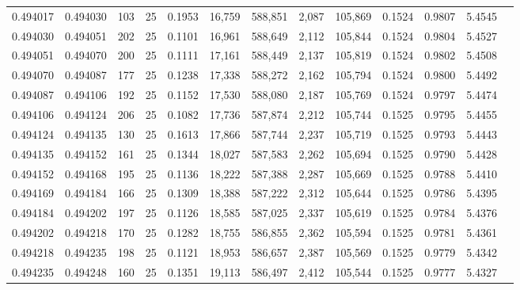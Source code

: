 \begin{tabular}{rrrrrrrrrrrrr}
0.494017 & 0.494030 & 103 &  25 &                                     0.1953 &  16,759 & 588,851 &   2,087 & 105,869 & 0.1524 & 0.9807 & 5.4545 \\
0.494030 & 0.494051 & 202 &  25 &                                     0.1101 &  16,961 & 588,649 &   2,112 & 105,844 & 0.1524 & 0.9804 & 5.4527 \\
0.494051 & 0.494070 & 200 &  25 &                                     0.1111 &  17,161 & 588,449 &   2,137 & 105,819 & 0.1524 & 0.9802 & 5.4508 \\
0.494070 & 0.494087 & 177 &  25 &                                     0.1238 &  17,338 & 588,272 &   2,162 & 105,794 & 0.1524 & 0.9800 & 5.4492 \\
0.494087 & 0.494106 & 192 &  25 &                                     0.1152 &  17,530 & 588,080 &   2,187 & 105,769 & 0.1524 & 0.9797 & 5.4474 \\
0.494106 & 0.494124 & 206 &  25 &                                     0.1082 &  17,736 & 587,874 &   2,212 & 105,744 & 0.1525 & 0.9795 & 5.4455 \\
0.494124 & 0.494135 & 130 &  25 &                                     0.1613 &  17,866 & 587,744 &   2,237 & 105,719 & 0.1525 & 0.9793 & 5.4443 \\
0.494135 & 0.494152 & 161 &  25 &                                     0.1344 &  18,027 & 587,583 &   2,262 & 105,694 & 0.1525 & 0.9790 & 5.4428 \\
0.494152 & 0.494168 & 195 &  25 &                                     0.1136 &  18,222 & 587,388 &   2,287 & 105,669 & 0.1525 & 0.9788 & 5.4410 \\
0.494169 & 0.494184 & 166 &  25 &                                     0.1309 &  18,388 & 587,222 &   2,312 & 105,644 & 0.1525 & 0.9786 & 5.4395 \\
0.494184 & 0.494202 & 197 &  25 &                                     0.1126 &  18,585 & 587,025 &   2,337 & 105,619 & 0.1525 & 0.9784 & 5.4376 \\
0.494202 & 0.494218 & 170 &  25 &                                     0.1282 &  18,755 & 586,855 &   2,362 & 105,594 & 0.1525 & 0.9781 & 5.4361 \\
0.494218 & 0.494235 & 198 &  25 &                                     0.1121 &  18,953 & 586,657 &   2,387 & 105,569 & 0.1525 & 0.9779 & 5.4342 \\
0.494235 & 0.494248 & 160 &  25 &                                     0.1351 &  19,113 & 586,497 &   2,412 & 105,544 & 0.1525 & 0.9777 & 5.4327 \\

\end{tabular}
